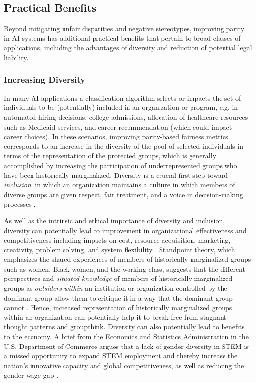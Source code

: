 \documentclass[11pt,dvipdfm]{article}
\begin{document}
\subsection{Practical Benefits}
Beyond mitigating unfair disparities and negative stereotypes, improving parity in AI systems has additional practical benefits that pertain to broad classes of applications, including the advantages of diversity and reduction of potential legal liability.

\subsubsection{Increasing Diversity}
In many AI applications a classification algorithm selects or impacts the set of individuals to be (potentially) included in an organization or program, e.g. in automated hiring decisions, college admissions, allocation of healthcare resources such as Medicaid services, and career recommendation (which could impact career choices).  In these scenarios, improving parity-based fairness metrics corresponds to an increase in the diversity of the pool of selected individuals in terms of the representation of the protected groups, which is generally accomplished by increasing the participation of underrepresented groups who have been historically marginalized.  Diversity is a crucial first step toward \emph{inclusion}, in which an organization maintains a culture in which members of diverse groups are given respect, fair treatment, and a voice in decision-making processes \cite{bell2011voice}. 

As well as the intrinsic and ethical importance of diversity and inclusion, diversity can potentially lead to improvement in organizational effectiveness and competitiveness \cite{page2008difference} including impacts on cost, resource acquisition, marketing, creativity, problem solving, and system flexibility \cite{cox1991managing}.  Standpoint theory, which emphasizes the shared experiences of members of historically marginalized groups such as women, Black women, and the working class, suggests that the different perspectives and \emph{situated knowledge} of members of historically marginalized groups as \emph{outsiders-within} an institution or organization controlled by the dominant group allow them to critique it in a way that the dominant group cannot \cite{hartsock1983feminist, collins2002black}.  Hence, increased representation of historically marginalized groups within an organization can potentially help it to break free from stagnant thought patterns and groupthink.  Diversity can also potentially lead to benefits to the economy.  A brief from the Economics and Statistics Administration in the U.S. Department of Commerce argues that a lack of gender diversity in STEM is a missed opportunity to expand STEM employment and thereby increase the nation's innovative capacity and global competitiveness, as well as reducing the gender wage-gap \cite{beede2011women}.
\end{document}
